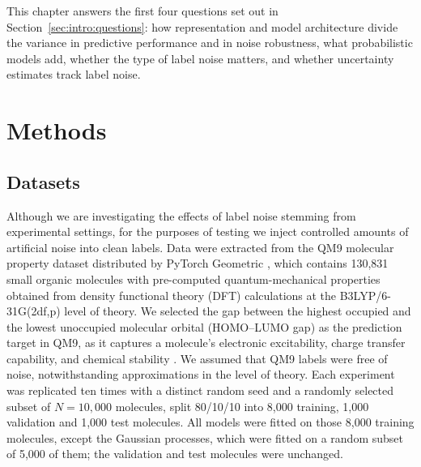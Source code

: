 This chapter answers the first four questions set out in Section~\ref{sec:intro:questions}: how representation and model architecture divide the variance in predictive performance and in noise robustness, what probabilistic models add, whether the type of label noise matters, and whether uncertainty estimates track label noise.

\section{Methods}\label{sec:robustness:methods}


\subsection{Datasets}

Although we are investigating the effects of label noise stemming from experimental settings, for the purposes of testing we inject controlled amounts of artificial noise into clean labels. Data were extracted from the QM9 molecular property dataset distributed by PyTorch Geometric \citep{Ramakrishnan2014}, which contains 130,831 small organic molecules with pre-computed quantum-mechanical properties obtained from density functional theory (DFT) calculations at the B3LYP/6-31G(2df,p) level of theory. We selected the gap between the highest occupied and the lowest unoccupied molecular orbital (HOMO--LUMO gap) as the prediction target in QM9, as it captures a molecule's electronic excitability, charge transfer capability, and chemical stability \citep{Fediai2023}. We assumed that QM9 labels were free of noise, notwithstanding approximations in the level of theory. Each experiment was replicated ten times with a distinct random seed and a randomly selected subset of $N = 10{,}000$ molecules, split 80/10/10 into 8,000 training, 1,000 validation and 1,000 test molecules. All models were fitted on those 8,000 training molecules, except the Gaussian processes, which were fitted on a random subset of 5,000 of them; the validation and test molecules were unchanged.

